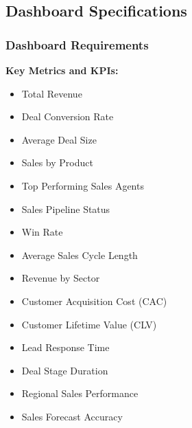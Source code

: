 \documentclass{article}
\begin{document}
\subsection{Dashboard Specifications}

\subsubsection{Dashboard Requirements}

\noindent \textbf{Key Metrics and KPIs:}
\begin{itemize}
    \item Total Revenue
    \item Deal Conversion Rate
    \item Average Deal Size
    \item Sales by Product
    \item Top Performing Sales Agents
    \item Sales Pipeline Status
    \item Win Rate
    \item Average Sales Cycle Length
    \item Revenue by Sector
    \item Customer Acquisition Cost (CAC)
    \item Customer Lifetime Value (CLV)
    \item Lead Response Time
    \item Deal Stage Duration
    \item Regional Sales Performance
    \item Sales Forecast Accuracy
\end{itemize}
\end{document}
